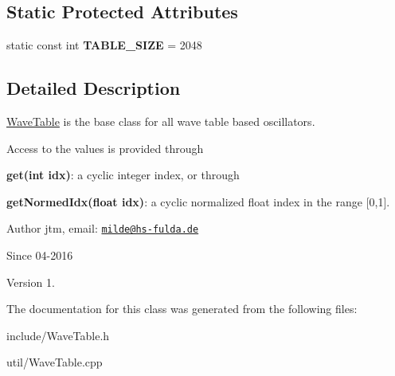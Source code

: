\subsection*{Static Protected Attributes}
\begin{DoxyCompactItemize}
\item 
\hypertarget{classWaveTable_ae8fe89b58ec31a5beda1bfc79d1c39ad}{static const int {\bfseries T\-A\-B\-L\-E\-\_\-\-S\-I\-Z\-E} = 2048}\label{classWaveTable_ae8fe89b58ec31a5beda1bfc79d1c39ad}

\end{DoxyCompactItemize}


\subsection{Detailed Description}
\hyperlink{classWaveTable}{Wave\-Table} is the base class for all wave table based oscillators.

Access to the values is provided through


\begin{DoxyItemize}
\item {\bfseries get(int idx)}\-: a cyclic integer index, or through
\item {\bfseries get\-Normed\-Idx(float idx)}\-: a cyclic normalized float index in the range \mbox{[}0,1\mbox{]}.
\end{DoxyItemize}

\begin{DoxyAuthor}{Author}
jtm, email\-:  \href{mailto:milde@hs-fulda.de}{\tt milde@hs-\/fulda.\-de} 
\end{DoxyAuthor}
\begin{DoxySince}{Since}
04-\/2016 
\end{DoxySince}
\begin{DoxyVersion}{Version}
1. 
\end{DoxyVersion}


The documentation for this class was generated from the following files\-:\begin{DoxyCompactItemize}
\item 
include/Wave\-Table.\-h\item 
util/Wave\-Table.\-cpp\end{DoxyCompactItemize}
